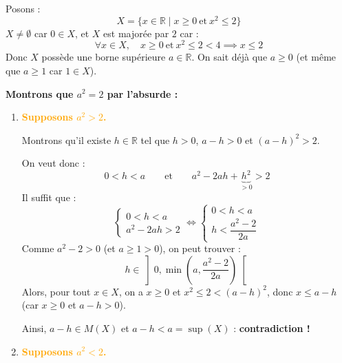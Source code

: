 \documentclass[a4paper,11pt]{article}
\newcommand{\R}{\mathbb{R}}
\newcommand{\cas}[1]{\textbf{\textcolor{orange}{#1}}}
\begin{document}
\begin{exemples}[Existence de $\sqrt{2} \in \R$]
Posons :
\[
X = \{ x \in \R \mid x \ge 0 \ \text{et} \ x^2 \le 2 \}
\]
$X \neq \emptyset$ car $0 \in X$, et $X$ est majorée par $2$ car :
\[
\forall x \in X, \quad x \ge 0 \ \text{et} \ x^2 \le 2 < 4 \implies x \le 2
\]
Donc $X$ possède une borne supérieure $a \in \R$. On sait déjà que $a \ge 0$ (et même que $a \ge 1$ car $1 \in X$).

\textbf{Montrons que $a^2 = 2$ par l'absurde :}
\begin{enumerate}
    \item \cas{Supposons $a^2 > 2$.}
    
    \begin{center}
    \end{center}
    
    Montrons qu'il existe $h \in \R$ tel que $h > 0$, $a - h > 0$ et $(a - h)^2 > 2$.
    
    On veut donc :
    \[
    0 < h < a \qquad \text{et} \qquad a^2 - 2ah + \underbrace{h^2}_{> 0} > 2
    \]
    Il suffit que :
    \[
    \begin{cases} 0 < h < a \\ a^2 - 2ah > 2 \end{cases} \iff \begin{cases} 0 < h < a \\ h < \dfrac{a^2 - 2}{2a} \end{cases}
    \]
    Comme $a^2 - 2 > 0$ (et $a \ge 1 > 0$), on peut trouver :
    \[
    h \in \left] 0, \min\left(a, \frac{a^2 - 2}{2a}\right) \right[
    \]
    Alors, pour tout $x \in X$, on a $x \ge 0$ et $x^2 \le 2 < (a - h)^2$, donc $x \le a - h$ (car $x \ge 0$ et $a - h > 0$).
    
    Ainsi, $a - h \in M(X)$ et $a - h < a = \sup(X)$ : \textbf{contradiction !}

    \item \cas{Supposons $a^2 < 2$.}
    
    \begin{center}
    \end{center}
    

\end{enumerate}
\end{exemples}
\end{document}
